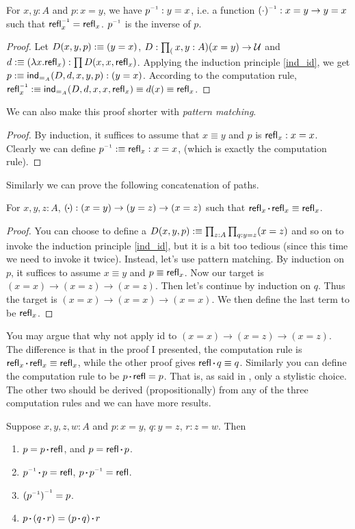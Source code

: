 \begin{lemma}
    For $x,y:A$ and $p: x=y$, we have $p\inv: y=x$, i.e.
    a function $(\cdot)\inv: x=y\to y=x$ such that $\refl_x\inv=
    \refl_x$. $p\inv$ is the inverse of $p$.
\end{lemma}
\begin{proof}
    Let $D(x,y,p):\equiv(y=x)$, $D:\prod_(x,y:A)(x=y)\to\mathcal{U}$ and
    $d:\equiv(\lambda x.\text{\sf refl}_x):\prod D(x,x,\text{\sf refl}_x)$. Applying the
    induction principle \eqref{ind_id}, we get 
    $p:\equiv\text{\sf ind}_{=_A}(D,d,x,y,p):(y=x)$. According to the computation
    rule, $\refl_x\inv\defn \ind_{=_A}(D,d,x,x,\refl_x)\equiv d(x)\equiv
    \refl_x$.
\end{proof}
We can also make this proof shorter with {\it pattern matching}.
\begin{proof}
    By induction, it suffices to assume that $x\equiv y$ and $p$ is
    $\text{\sf refl}_x:x=x$. Clearly we can define $p\inv\defn \refl_x:x=x$, (which
    is exactly the computation rule).
\end{proof}

\newcommand{\sqcdot}{\mathbin{\vcenter{\hbox{\rule{.3ex}{.3ex}}}}}
\newcommand{\concat}{\sqcdot}
Similarly we can prove the following concatenation of paths.  
\begin{lemma}
    For $x,y,z: A$, $(\concat):(x=y)\to(y=z)\to(x=z)$ such that
    $\refl_x\concat \refl_x\equiv\refl_x$. 
\end{lemma}
\begin{proof}
    You can choose to define a $D(x,y,p):\equiv\prod_{z:A}\prod_{q:y=z}(x=z)$
    and so on to invoke the induction principle \eqref{ind_id}, but it is
    a bit too tedious (since this time we need to invoke it twice).
    Instead, let's use pattern matching. By induction on $p$, it suffices 
    to assume $x\equiv y$ and $p\equiv\text{\sf refl}_x$. Now our target is
    $(x=x)\to(x=z)\to(x=z)$. Then let's continue by induction on $q$.
    Thus the target is $(x=x)\to(x=x)\to(x=x)$. We then define the last
    term to be $\text{\sf refl}_x$. 
\end{proof}
You may argue that why not apply id to $(x=x)\to(x=z)\to(x=z)$. The 
difference is that in the proof I presented, the computation rule is 
$\refl_x\concat\refl_x\equiv\refl_x$, while the other proof gives 
$\refl\concat q\equiv q$. Similarly you can define the computation
rule to be $p\concat\refl=p$. That is, as said in 
\cite{homotopy-type-theory}, only a stylistic choice. The other two
should be derived (propositionally) from any of the three computation 
rules and we can have more results.
\begin{lemma}
    Suppose $x,y,z,w:A$ and $p:x=y$, $q:y=z$, $r:z=w$. Then
    \begin{enumerate}
        \item $p=p\concat\refl$, and $p=\refl\concat p$.
        \item $p\inv\concat p=\refl$, $p\concat p\inv=\refl$.
        \item ${(p\inv)}\inv=p$.
        \item $p\concat(q\concat r) = (p\concat q)\concat r$
    \end{enumerate}
\end{lemma}

